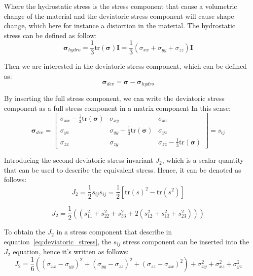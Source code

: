 \documentclass[12pt]{article}
\begin{document}
Where the hydrostatic stress is the stress component that cause a volumetric change of the material and 
the deviatoric stress component will cause shape change, which here for instance a distortion in the material. The
hydrostatic stress can be defined as follow:
\begin{equation}
\boldsymbol{\sigma}_{hydro} = \frac{1}{3} \text{tr}(\boldsymbol{\sigma}) \boldsymbol{I} = \frac{1}{3} \left( \sigma_{xx} + \sigma_{yy} + \sigma_{zz} \right) \boldsymbol{I}
\end{equation}

Then we are interested in the deviatoric stress component, which can be defined as:
\begin{equation}
\boldsymbol{\sigma}_{dev} = \boldsymbol{\sigma} - \boldsymbol{\sigma}_{hydro}
\end{equation}

By inserting the full stress component, we can write the deviatoric stress component as a full stress component in a matrix component
In this sense:
\begin{equation}
\boldsymbol{\sigma}_{dev} =
    \begin{bmatrix}
    \sigma_{xx} - \frac{1}{3}\text{tr}(\boldsymbol{\sigma}) & \sigma_{xy} & \sigma_{xz} \\
    \sigma_{yx} & \sigma_{yy} - \frac{1}{3}\text{tr}(\boldsymbol{\sigma}) & \sigma_{yz} \\
    \sigma_{zx} & \sigma_{zy} & \sigma_{zz} - \frac{1}{3}\text{tr}(\boldsymbol{\sigma})
    \label{eq:deviatoric_stress}
    \end{bmatrix}
    = s_{ij}
\end{equation}

Introducing the second deviatoric stress invariant $J_2$, which is a scalar quantity that can be used to describe the equivalent stress.
Hence, it can be denoted as follows:
\begin{equation}
J_2 = \frac{1}{2}s_{ij}s_{ij} = \frac{1}{2}[\text{tr}(s)^2-\text{tr}(s^2)]
\end{equation}

\begin{equation}
    J_2 = \frac{1}{2} \left((s_{11}^2 + s_{22}^2 + s_{33}^2 + 2(s_{12}^2 + s_{13}^2 + s_{23}^2)) \right)
\end{equation}

To obtain the $J_2$ in a stress component that describe in equation~\ref{eq:deviatoric_stress}, 
the $s_{ij}$ stress component can be inserted into the $J_2$ equation, hence it's written as follows:
\begin{equation}
    J_2 = \frac{1}{6} \left( (\sigma_{xx} - \sigma_{yy})^2 + (\sigma_{yy} - \sigma_{zz})^2 + (\sigma_{zz} - \sigma_{xx})^2 \right) + \sigma_{xy}^2 + \sigma_{xz}^2 + \sigma_{yz}^2
\end{equation}
\end{document}
